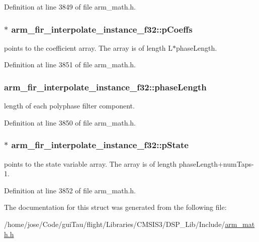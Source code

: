 Definition at line 3849 of file arm\-\_\-math.\-h.

\hypertarget{structarm__fir__interpolate__instance__f32_a86053b715980a93c9df630d6de5bb63c}{
\subsubsection[{p\-Coeffs}]{$\ast$ arm\-\_\-fir\-\_\-interpolate\-\_\-instance\-\_\-f32\-::p\-Coeffs}}\label{structarm__fir__interpolate__instance__f32_a86053b715980a93c9df630d6de5bb63c}
points to the coefficient array. The array is of length L$\ast$phase\-Length. 

Definition at line 3851 of file arm\-\_\-math.\-h.

\hypertarget{structarm__fir__interpolate__instance__f32_a389e669e13ec56292a70db8e92194b12}{
\subsubsection[{phase\-Length}]{ arm\-\_\-fir\-\_\-interpolate\-\_\-instance\-\_\-f32\-::phase\-Length}}\label{structarm__fir__interpolate__instance__f32_a389e669e13ec56292a70db8e92194b12}
length of each polyphase filter component. 

Definition at line 3850 of file arm\-\_\-math.\-h.

\hypertarget{structarm__fir__interpolate__instance__f32_a42a8ba1bda85fa86d7b6c84d3da4c75b}{
\subsubsection[{p\-State}]{$\ast$ arm\-\_\-fir\-\_\-interpolate\-\_\-instance\-\_\-f32\-::p\-State}}\label{structarm__fir__interpolate__instance__f32_a42a8ba1bda85fa86d7b6c84d3da4c75b}
points to the state variable array. The array is of length phase\-Length+num\-Taps-\/1. 

Definition at line 3852 of file arm\-\_\-math.\-h.



The documentation for this struct was generated from the following file\-:\begin{DoxyCompactItemize}
\item 
/home/jose/\-Code/gui\-Tau/flight/\-Libraries/\-C\-M\-S\-I\-S3/\-D\-S\-P\-\_\-\-Lib/\-Include/\hyperlink{arm__math_8h}{arm\-\_\-math.\-h}\end{DoxyCompactItemize}
